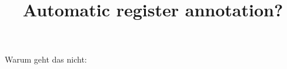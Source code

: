 \documentclass[11pt]{article}
\title{Automatic register annotation?}
\begin{document}
\maketitle








Warum geht das nicht: \cite{Biber1988} 

\end{document}

